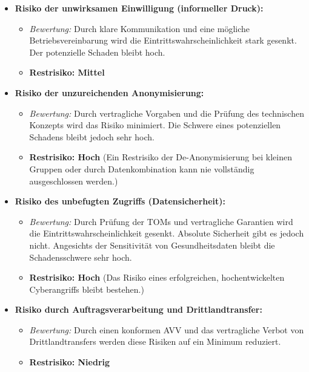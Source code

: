 \documentclass[12pt, a4paper]{article}
\begin{document}
\begin{itemize}
    \item \textbf{Risiko der unwirksamen Einwilligung (informeller Druck):}
    \begin{itemize}
        \item \textit{Bewertung:} Durch klare Kommunikation und eine mögliche Betriebsvereinbarung wird die Eintrittswahrscheinlichkeit stark gesenkt. Der potenzielle Schaden bleibt hoch.
        \item \textbf{Restrisiko: Mittel}
    \end{itemize}
    \vspace{0.3cm} %
    
    \item \textbf{Risiko der unzureichenden Anonymisierung:}
    \begin{itemize}
        \item \textit{Bewertung:} Durch vertragliche Vorgaben und die Prüfung des technischen Konzepts wird das Risiko minimiert. Die Schwere eines potenziellen Schadens bleibt jedoch sehr hoch.
        \item \textbf{Restrisiko: Hoch} (Ein Restrisiko der De-Anonymisierung bei kleinen Gruppen oder durch Datenkombination kann nie vollständig ausgeschlossen werden.)
    \end{itemize}
    \vspace{0.3cm}
    
    \item \textbf{Risiko des unbefugten Zugriffs (Datensicherheit):}
    \begin{itemize}
        \item \textit{Bewertung:} Durch Prüfung der TOMs und vertragliche Garantien wird die Eintrittswahrscheinlichkeit gesenkt. Absolute Sicherheit gibt es jedoch nicht. Angesichts der Sensitivität von Gesundheitsdaten bleibt die Schadensschwere sehr hoch.
        \item \textbf{Restrisiko: Hoch} (Das Risiko eines erfolgreichen, hochentwickelten Cyberangriffs bleibt bestehen.)
    \end{itemize}
    \vspace{0.3cm}
    
    \item \textbf{Risiko durch Auftragsverarbeitung und Drittlandtransfer:}
    \begin{itemize}
        \item \textit{Bewertung:} Durch einen konformen AVV und das vertragliche Verbot von Drittlandtransfers werden diese Risiken auf ein Minimum reduziert.
        \item \textbf{Restrisiko: Niedrig}
    \end{itemize}
\end{itemize}
\end{document}
